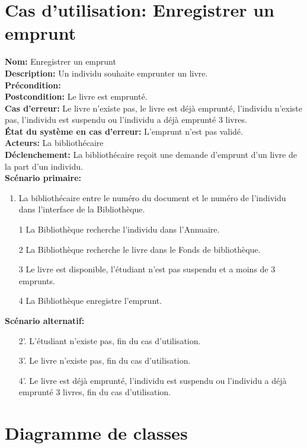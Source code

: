 \documentclass{article}
\begin{document}
\section{Cas d'utilisation: Enregistrer un emprunt}

\noindent\textbf{Nom:} Enregistrer un emprunt \\
\textbf{Description:} Un individu souhaite emprunter un livre.\\
\textbf{Précondition:} \\
\textbf{Postcondition:} Le livre est emprunté.\\
\textbf{Cas d'erreur:} Le livre n’existe pas, le livre est déjà emprunté, l’individu n’existe pas, l’individu est suspendu ou l’individu a déjà emprunté 3 livres.\\
\textbf{État du système en cas d'erreur:} L’emprunt n'est pas validé.\\
\textbf{Acteurs:} La bibliothécaire \\
\textbf{Déclenchement:} La bibliothécaire reçoit une demande d'emprunt d'un livre de la part d'un individu.\\
\textbf{Scénario primaire:}
\begin{enumerate}
	\item La bibliothécaire entre le numéro du document et le numéro de l'individu dans l'interface de la Bibliothèque.
	\item[1] La Bibliothèque recherche l'individu dans l'Annuaire.
	\item[2] La Bibliothèque recherche le livre dans le Fonds de bibliothèque.
	\item[3] Le livre est disponible, l'étudiant n'est pas suspendu et a moins de 3 emprunts.
	\item[4] La Bibliothèque enregistre l'emprunt.
\end{enumerate}

\noindent\textbf{Scénario alternatif:}
\begin{itemize}
	\item[2'.] L’étudiant n’existe pas, fin du cas d’utilisation.
	\item[3'.] Le livre n’existe pas, fin du cas d’utilisation.
	\item[4'.] Le livre est déjà emprunté, l’individu est suspendu ou l’individu a déjà emprunté 3 livres, fin du cas d’utilisation.
\end{itemize}


\section{Diagramme de classes}
\end{document}
